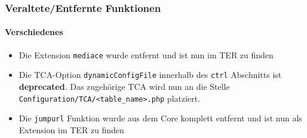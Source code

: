 \begin{frame}[fragile]
	\frametitle{Veraltete/Entfernte Funktionen}
	\framesubtitle{Verschiedenes}

	\begin{itemize}

		\item Die Extension \texttt{mediace} wurde entfernt und ist nun im TER zu finden

		\item Die TCA-Option \texttt{dynamicConfigFile} innerhalb des \texttt{ctrl} Abschnitts ist \textbf{deprecated}.
			Das zugehörige TCA wird nun an die Stelle \texttt{Configuration/TCA/<table\_name>.php} platziert.

		\item Die \texttt{jumpurl} Funktion wurde aus dem Core komplett entfernt und ist nun als Extension im TER zu finden

	\end{itemize}

\end{frame}

